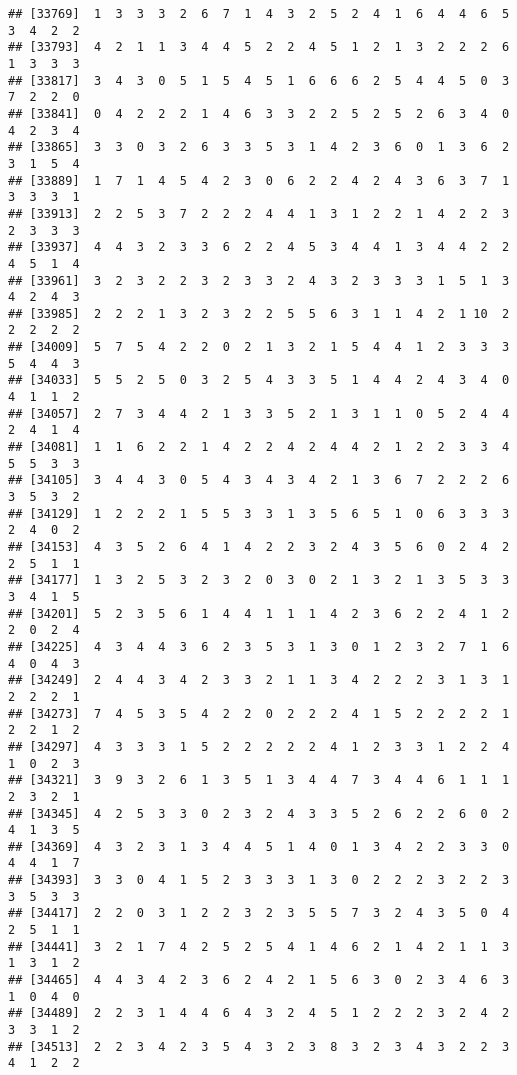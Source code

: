 \documentclass[
]{article}
\begin{document}
\begin{verbatim}
## [33769]  1  3  3  3  2  6  7  1  4  3  2  5  2  4  1  6  4  4  6  5  3  4  2  2
## [33793]  4  2  1  1  3  4  4  5  2  2  4  5  1  2  1  3  2  2  2  6  1  3  3  3
## [33817]  3  4  3  0  5  1  5  4  5  1  6  6  6  2  5  4  4  5  0  3  7  2  2  0
## [33841]  0  4  2  2  2  1  4  6  3  3  2  2  5  2  5  2  6  3  4  0  4  2  3  4
## [33865]  3  3  0  3  2  6  3  3  5  3  1  4  2  3  6  0  1  3  6  2  3  1  5  4
## [33889]  1  7  1  4  5  4  2  3  0  6  2  2  4  2  4  3  6  3  7  1  3  3  3  1
## [33913]  2  2  5  3  7  2  2  2  4  4  1  3  1  2  2  1  4  2  2  3  2  3  3  3
## [33937]  4  4  3  2  3  3  6  2  2  4  5  3  4  4  1  3  4  4  2  2  4  5  1  4
## [33961]  3  2  3  2  2  3  2  3  3  2  4  3  2  3  3  3  1  5  1  3  4  2  4  3
## [33985]  2  2  2  1  3  2  3  2  2  5  5  6  3  1  1  4  2  1 10  2  2  2  2  2
## [34009]  5  7  5  4  2  2  0  2  1  3  2  1  5  4  4  1  2  3  3  3  5  4  4  3
## [34033]  5  5  2  5  0  3  2  5  4  3  3  5  1  4  4  2  4  3  4  0  4  1  1  2
## [34057]  2  7  3  4  4  2  1  3  3  5  2  1  3  1  1  0  5  2  4  4  2  4  1  4
## [34081]  1  1  6  2  2  1  4  2  2  4  2  4  4  2  1  2  2  3  3  4  5  5  3  3
## [34105]  3  4  4  3  0  5  4  3  4  3  4  2  1  3  6  7  2  2  2  6  3  5  3  2
## [34129]  1  2  2  2  1  5  5  3  3  1  3  5  6  5  1  0  6  3  3  3  2  4  0  2
## [34153]  4  3  5  2  6  4  1  4  2  2  3  2  4  3  5  6  0  2  4  2  2  5  1  1
## [34177]  1  3  2  5  3  2  3  2  0  3  0  2  1  3  2  1  3  5  3  3  3  4  1  5
## [34201]  5  2  3  5  6  1  4  4  1  1  1  4  2  3  6  2  2  4  1  2  2  0  2  4
## [34225]  4  3  4  4  3  6  2  3  5  3  1  3  0  1  2  3  2  7  1  6  4  0  4  3
## [34249]  2  4  4  3  4  2  3  3  2  1  1  3  4  2  2  2  3  1  3  1  2  2  2  1
## [34273]  7  4  5  3  5  4  2  2  0  2  2  2  4  1  5  2  2  2  2  1  2  2  1  2
## [34297]  4  3  3  3  1  5  2  2  2  2  2  4  1  2  3  3  1  2  2  4  1  0  2  3
## [34321]  3  9  3  2  6  1  3  5  1  3  4  4  7  3  4  4  6  1  1  1  2  3  2  1
## [34345]  4  2  5  3  3  0  2  3  2  4  3  3  5  2  6  2  2  6  0  2  4  1  3  5
## [34369]  4  3  2  3  1  3  4  4  5  1  4  0  1  3  4  2  2  3  3  0  4  4  1  7
## [34393]  3  3  0  4  1  5  2  3  3  3  1  3  0  2  2  2  3  2  2  3  3  5  3  3
## [34417]  2  2  0  3  1  2  2  3  2  3  5  5  7  3  2  4  3  5  0  4  2  5  1  1
## [34441]  3  2  1  7  4  2  5  2  5  4  1  4  6  2  1  4  2  1  1  3  1  3  1  2
## [34465]  4  4  3  4  2  3  6  2  4  2  1  5  6  3  0  2  3  4  6  3  1  0  4  0
## [34489]  2  2  3  1  4  4  6  4  3  2  4  5  1  2  2  2  3  2  4  2  3  3  1  2
## [34513]  2  2  3  4  2  3  5  4  3  2  3  8  3  2  3  4  3  2  2  3  4  1  2  2

\end{verbatim}
\end{document}

